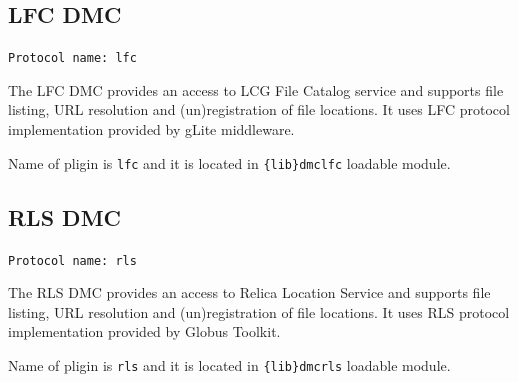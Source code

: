 \documentclass{book}
\begin{document}
\subsection{LFC DMC}

\texttt{Protocol name: lfc}

The LFC DMC provides an access to LCG File Catalog service and supports file listing, URL resolution and (un)registration of file locations. It uses LFC protocol implementation provided by gLite middleware.

Name of pligin is \texttt{lfc} and it is located in \texttt{\{lib\}dmclfc} loadable module.


\subsection{RLS DMC}

\texttt{Protocol name: rls}

The RLS DMC provides an access to Relica Location Service and supports file listing, URL resolution and (un)registration of file locations. It uses RLS protocol implementation provided by Globus Toolkit.

Name of pligin is \texttt{rls} and it is located in \texttt{\{lib\}dmcrls} loadable module.




\end{document}
